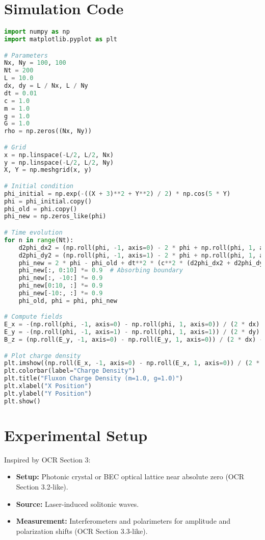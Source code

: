 \documentclass{article}
\begin{document}
\section{Simulation Code}
\begin{lstlisting}[language=Python, caption=Fluxonic Field Simulation, label=lst:fluxon]
import numpy as np
import matplotlib.pyplot as plt

# Parameters
Nx, Ny = 100, 100
Nt = 200
L = 10.0
dx, dy = L / Nx, L / Ny
dt = 0.01
c = 1.0
m = 1.0
g = 1.0
G = 1.0
rho = np.zeros((Nx, Ny))

# Grid
x = np.linspace(-L/2, L/2, Nx)
y = np.linspace(-L/2, L/2, Ny)
X, Y = np.meshgrid(x, y)

# Initial condition
phi_initial = np.exp(-((X + 3)**2 + Y**2) / 2) * np.cos(5 * Y)
phi = phi_initial.copy()
phi_old = phi.copy()
phi_new = np.zeros_like(phi)

# Time evolution
for n in range(Nt):
    d2phi_dx2 = (np.roll(phi, -1, axis=0) - 2 * phi + np.roll(phi, 1, axis=0)) / dx**2
    d2phi_dy2 = (np.roll(phi, -1, axis=1) - 2 * phi + np.roll(phi, 1, axis=1)) / dy**2
    phi_new = 2 * phi - phi_old + dt**2 * (c**2 * (d2phi_dx2 + d2phi_dy2) - m**2 * phi - g * phi**3 + 8 * np.pi * G * rho)
    phi_new[:, 0:10] *= 0.9  # Absorbing boundary
    phi_new[:, -10:] *= 0.9
    phi_new[0:10, :] *= 0.9
    phi_new[-10:, :] *= 0.9
    phi_old, phi = phi, phi_new

# Compute fields
E_x = -(np.roll(phi, -1, axis=0) - np.roll(phi, 1, axis=0)) / (2 * dx)
E_y = -(np.roll(phi, -1, axis=1) - np.roll(phi, 1, axis=1)) / (2 * dy)
B_z = (np.roll(E_y, -1, axis=0) - np.roll(E_y, 1, axis=0)) / (2 * dx) - (np.roll(E_x, -1, axis=1) - np.roll(E_x, 1, axis=1)) / (2 * dy)

# Plot charge density
plt.imshow((np.roll(E_x, -1, axis=0) - np.roll(E_x, 1, axis=0)) / (2 * dx) + (np.roll(E_y, -1, axis=1) - np.roll(E_y, 1, axis=1)) / (2 * dy), cmap='inferno')
plt.colorbar(label="Charge Density")
plt.title("Fluxon Charge Density (m=1.0, g=1.0)")
plt.xlabel("X Position")
plt.ylabel("Y Position")
plt.show()
\end{lstlisting}

\section{Experimental Setup}
Inspired by OCR Section 3:
\begin{itemize}
    \item \textbf{Setup:} Photonic crystal or BEC optical lattice near absolute zero (OCR Section 3.2-like).
    \item \textbf{Source:} Laser-induced solitonic waves.
    \item \textbf{Measurement:} Interferometers and polarimeters for amplitude and polarization shifts (OCR Section 3.3-like).
\end{itemize}
\end{document}
